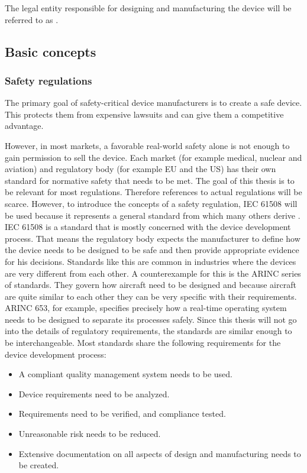The legal entity responsible for designing and manufacturing the device will be referred to as \mfg{}.
\subsection{Basic concepts}
\subsubsection{Safety regulations}

The primary goal of safety-critical device manufacturers is to create a safe device. This protects them from expensive lawsuits and can give them a competitive advantage.

However, in most markets, a favorable real-world safety alone is not enough to gain permission to sell the device.  Each market (for example medical, nuclear and aviation) and regulatory body (for example EU and the US) has their own standard for normative safety that needs to be met. The goal of this thesis is to be relevant for most regulations. Therefore references to actual regulations will be scarce. However, to introduce the concepts of a safety regulation, IEC 61508 will be used because it represents a general standard from which many others derive \cite{IEC.2000-1}\cite{IEC.2000-2}\cite{IEC.2000-3}. IEC 61508 is a standard that is mostly concerned with the device development process. That means the regulatory body expects the manufacturer to define how the device needs to be designed to be safe and then provide appropriate evidence for his decisions. Standards like this are common in industries where the devices are very different from each other. A counterexample for this is the ARINC series of standards. They govern how aircraft need to be designed and because aircraft are quite similar to each other they can be very specific with their requirements. ARINC 653, for example, specifies precisely how a real-time operating system needs to be designed to separate its processes safely. Since this thesis will not go into the details of regulatory requirements, the standards are similar enough to be interchangeable. Most standards share the following requirements for the device development process:
\begin{itemize}
\item A compliant quality management system needs to be used.
\item Device requirements need to be analyzed.
\item Requirements need to be verified, and compliance tested.
\item Unreasonable risk needs to be reduced.
\item Extensive documentation on all aspects of design and manufacturing needs to be created.
\end{itemize}

